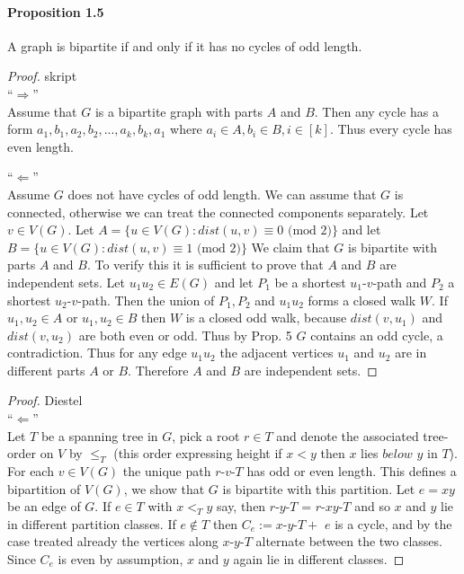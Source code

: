 \paragraph{Proposition 1.5} A graph is bipartite if and only if it has no cycles 
of odd length.
\begin{proof}{skript} \\
    \enquote{$\Rightarrow$}  \\
    Assume that $ G $ is a bipartite graph with parts $ A $ and $ B $. Then any cycle
    has a form $a_1,b_1,a_2,b_2,...,a_k,b_k,a_1 $ where $ a_i \in A, b_i \in B, 
    i \in [k]$. Thus every cycle has even length. 

    \smallskip
    \noindent\enquote{$\Leftarrow$} \\
    Assume $ G $ does not have cycles of odd length. We can assume that $ G $ is 
    connected, otherwise we can treat the connected components separately.
    Let $ v \in V(G) $.
    Let $ A = \{u \in V(G) : dist(u,v) \equiv 0 \text{ (mod } 2)\} $ and let
    $ B = \{u \in V(G) : dist(u,v) \equiv 1 \text{ (mod } 2)\} $  We claim that $ G $ is 
    bipartite with parts $ A $ and $ B $. To verify this it is sufficient to 
    prove that $ A $ and $ B $ are independent sets.
    Let $u_1u_2 \in E(G) $ and let $ P_1 $ be a shortest $u_1$-$v$-path and 
    $ P_2 $ a shortest $u_2$-$v$-path. Then the union of $ P_1, P_2 $ 
    and $ u_1u_2 $ forms a closed walk $ W $. If $ u_1, u_2 \in A $ or 
    $ u_1, u_2 \in B $ then $ W $ is a closed odd walk, because $ dist(v, u_1) $ 
    and $ dist(v, u_2) $ are both even or odd. Thus by Prop. 5 $ G $ contains
    an odd cycle, a contradiction. Thus for any edge $ u_1u_2 $ the adjacent
    vertices $ u_1 $ and $ u_2 $ are in different parts $ A $ or $ B $.
    Therefore $ A $ and $ B $ are independent sets. 
\end{proof}
\begin{proof}{Diestel} $ $  \\
    \enquote{$\Leftarrow$} \\
    Let $ T $ be a spanning tree in $ G $, pick a root $ r \in T $ and denote the 
    associated tree-order on $ V $ by $ \leq_T $ (this order expressing height if 
    $ x < y $ then $ x $ lies $ below $ $ y $ in $ T $). For each $ v \in V(G) $ the 
    unique path $r$-$v$-$T$ has odd or even length.
    This defines a bipartition of $ V(G) $, we show that $ G $ is bipartite with this
    partition.
    Let $ e = xy $ be an edge of $ G$. If $ e \in T $ with $ x <_T y $ say, then 
    $r$-$y$-$T$ = $r$-$xy$-$T$ and so $ x $ and $ y $ lie in different partition 
    classes. If $ e \notin T $ then $ C_e := x$-$y$-$T +$ $e $ is a cycle, and
    by the case treated already the vertices along $x$-$y$-$T$ alternate between 
    the two classes. Since $ C_e $ is even by assumption, $ x $ and $ y $ again lie
    in different classes. 
\end{proof}

